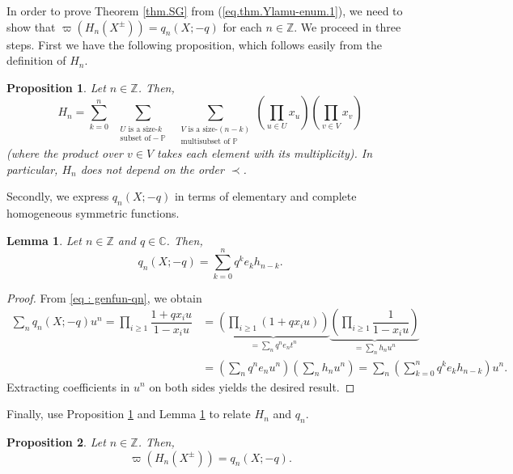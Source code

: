 \documentclass[revision]{FPSAC2024}
\newtheorem{lem}{Lemma}
\newtheorem{proposition}{Proposition}
\newcommand{\CC}{\mathbb{C}} %
\newcommand{\ZZ}{\mathbb{Z}} %
\begin{document}
In order to prove Theorem \ref{thm.SG} from (\ref{eq.thm.Ylamu-enum.1}), we need to show that $\varpi(H_n(X^\pm)) = q_n(X; -q)$ for each $n \in \ZZ$. We proceed in three steps. First we have the following proposition, which follows easily from the definition of $H_n$.
%
\begin{proposition}
\label{prop.H-as-sum}Let $n \in \ZZ$. Then,
\[
H_{n}=\sum_{k=0}^{n}\ \ \sum_{\substack{U\text{ is a size-}k\\\text{subset of
}-\mathbb{P}}}\ \ \sum_{\substack{V\text{ is a size-}\left(  n-k\right)
\\\text{multisubset of }\mathbb{P}}}\left(  \prod_{u\in U}x_{u}\right)
\left(  \prod_{v\in V}x_{v}\right)
\]
(where the product over $v\in V$ takes each element with its multiplicity). In
particular, $H_{n}$ does not depend on the order $\prec$.
\end{proposition}
%
Secondly, we express $q_n(X;-q)$ in terms of elementary and complete homogeneous symmetric functions. 
\begin{lem}
\label{lem.qeh}
Let $n \in \ZZ$ and $q \in \CC$. Then,
\begin{equation}
q_{n}(X;-q) =\sum_{k=0}^{n}q^{k}e_{k}h_{n-k}.
\label{eq.prop.Qn.fmls.4}%
\end{equation}
\end{lem}
\begin{proof}
From \eqref{eq : genfun-qn}, we obtain
\begin{align*}
\sum_{n}q_{n}(X;-q)u^{n}=\prod_{i\geq1}\dfrac{1+qx_{i}u}{1-x_{i}u}  &  =\underbrace{\left(
\prod_{i\geq1}\left(  1+qx_{i}u\right)  \right)  }_{=\sum_{n}q^{n}e_{n}t^{n}}\underbrace{\left(  \prod_{i\geq1}\dfrac{1}{1-x_{i}u}\right)
}_{=\sum_{n}h_{n}u^{n}}\\
&  =\left(  \sum_{n}q^{n}e_{n}u^{n}\right)  \left(  \sum
_{n}h_{n}u^{n}\right) =\sum_{n}\left(  \sum_{k=0}^{n}q^{k}e_{k}%
h_{n-k}\right)u^{n}.
\end{align*}
Extracting coefficients in $u^n$ on both sides yields the desired result.
\end{proof}
%
Finally, use Proposition \ref{prop.H-as-sum} and Lemma \ref{lem.qeh} to relate $H_n$ and $q_n$.  
\begin{proposition}
\label{prop.Q=piH}Let $n\in\mathbb{Z}$. Then,%
\[
\varpi\left(  H_{n}(X^\pm)\right)  =q_{n}(X;-q).
\]
\end{proposition}
\end{document}
